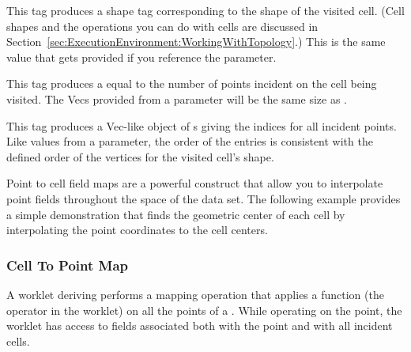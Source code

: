 \begin{description}
  \numericexecutionsignaturetags

\item[\sigtag{CellShape}] This tag produces a shape tag corresponding to
  the shape of the visited cell. (Cell shapes and the operations you can do
  with cells are discussed in
  Section~\ref{sec:ExecutionEnvironment:WorkingWithTopology}.) This is the
  same value that gets provided if you reference the
   parameter.

\item[\sigtag{PointCount}] This tag produces a  equal to
  the number of points incident on the cell being visited. The Vecs
  provided from a  parameter will be the same
  size as .

\item[\sigtag{PointIndices}] This tag produces a Vec-like object of
  s giving the indices for all incident points. Like values from a
   parameter, the order of the entries is
  consistent with the defined order of the vertices for the visited cell's
  shape.

  \commonexecutionsignaturetags
\end{description}

Point to cell field maps are a powerful construct that allow you to
interpolate point fields throughout the space of the data set. The
following example provides a simple demonstration that finds the geometric
center of each cell by interpolating the point coordinates to the cell
centers.



\subsubsection{Cell To Point Map}
\label{sec:WorkletMapCellToPoint}


A worklet deriving  performs a mapping
operation that applies a function (the operator in the worklet) on all the
points of a . While operating on the point, the
worklet has access to fields associated both with the point and with all
incident cells.

